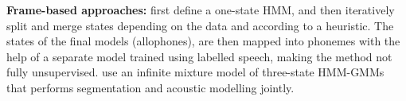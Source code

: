
\textbf{Frame-based approaches:} %
\textcite{varadarajan2008unsupervised} first define a one-state HMM, and then iteratively split and merge states depending on the data and according to a heuristic.
The states of the final models (allophones), are then mapped into phonemes with the help of a separate model trained using labelled speech, making the method not fully unsupervised.
\textcite{lee2012nonparametric} use an infinite mixture model of three-state HMM-GMMs that performs segmentation and acoustic modelling jointly.
